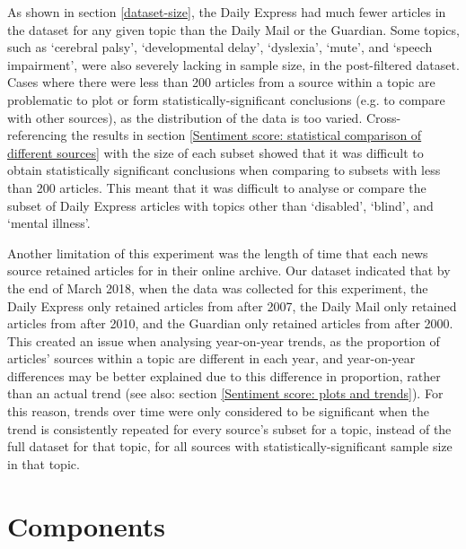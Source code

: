 \documentclass{report}
\newcommand{\textapprox}{\raisebox{0.5ex}{\texttildelow}}  %
\begin{document}
As shown in section \ref{dataset-size}, the Daily Express had much fewer articles in the dataset for any given topic than the Daily Mail or the Guardian.
Some topics, such as `cerebral palsy', `developmental delay', `dyslexia', `mute', and `speech impairment', were also severely lacking in sample size, in the post-filtered dataset.
Cases where there were less than \textapprox200 articles from a source within a topic are problematic to plot or form statistically-significant conclusions (e.g. to compare with other sources), as the distribution of the data is too varied.
Cross-referencing the results in section \ref{Sentiment score: statistical comparison of different sources} with the size of each subset showed that it was difficult to obtain statistically significant conclusions when comparing to subsets with less than \textapprox200 articles.
This meant that it was difficult to analyse or compare the subset of Daily Express articles with topics other than `disabled', `blind', and `mental illness'.

Another limitation of this experiment was the length of time that each news source retained articles for in their online archive.
Our dataset indicated that by the end of March 2018, when the data was collected for this experiment, the Daily Express only retained articles from after \textapprox2007, the Daily Mail only retained articles from after \textapprox2010, and the Guardian only retained articles from after \textapprox2000. 
This created an issue when analysing year-on-year trends, as the proportion of articles' sources within a topic are different in each year, and year-on-year differences may be better explained due to this difference in proportion, rather than an actual trend (see also: section \ref{Sentiment score: plots and trends}).
For this reason, trends over time were only considered to be significant when the trend is consistently repeated for every source's subset for a topic, instead of the full dataset for that topic, for all sources with statistically-significant sample size in that topic. 

\section{Components} \label{Components}
\end{document}
